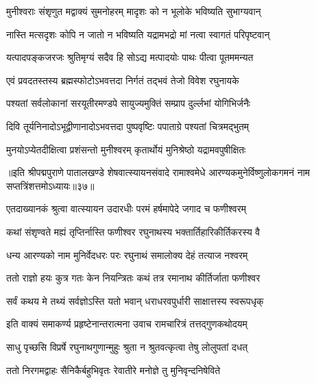 \twolineshloka
{मुनीश्वराः संशृणुत मद्वाक्यं सुमनोहरम्}
{मादृशः को न भूलोके भविष्यति सुभाग्यवान्}%

\twolineshloka
{नास्ति मत्सदृशः कोपि न जातो न भविष्यति}
{यद्रामभद्रो मां नत्वा स्वागतं परिपृष्टवान्}%

\twolineshloka
{यत्पादपङ्कजरजः श्रुतिमृग्यं सदैव हि}
{सोऽद्य मत्पादयोः पाथः पीत्वा पूतममन्यत}%

\twolineshloka
{एवं प्रवदतस्तस्य ब्रह्मस्फोटोऽभवत्तदा}
{निर्गतं तद्भवं तेजो विवेश रघुनायके}%

\twolineshloka
{पश्यतां सर्वलोकानां सरयूतीरमण्डपे}
{सायुज्यमुक्तिं सम्प्राप दुर्ल्लभां योगिभिर्जनैः}%

\twolineshloka
{दिवि तूर्यनिनादोऽभूद्वीणानादोऽभवत्तदा}
{पुष्पवृष्टिः पपाताग्रे पश्यतां चित्रमद्भुतम्}%

\twolineshloka
{मुनयोऽप्येतदीक्षित्वा प्रशंसन्तो मुनीश्वरम्}
{कृतार्थोयं मुनिश्रेष्ठो यद्रामवपुषीक्षितः}%

॥इति श्रीपद्मपुराणे पातालखण्डे शेषवात्स्यायनसंवादे रामाश्वमेधे आरण्यकमुनेर्विष्णुलोकगमनं नाम सप्तत्रिंशत्तमोऽध्यायः॥३७॥



\twolineshloka
{एतदाख्यानकं श्रुत्वा वात्स्यायन उदारधीः}
{परमं हर्षमापेदे जगाद च फणीश्वरम्}%


\twolineshloka
{कथां संशृण्वते मह्यं तृप्तिर्नास्ति फणीश्वर}
{रघुनाथस्य भक्तार्तिहारिकीर्तिकरस्य वै}%

\twolineshloka
{धन्य आरण्यको नाम मुनिर्वेदधरः परः}
{रघुनाथं समालोक्य देहं तत्याज नश्वरम्}%

\twolineshloka
{ततो राज्ञो हयः कुत्र गतः केन नियन्त्रितः}
{कथं तत्र रमानाथ कीर्तिर्जाता फणीश्वर}%

\twolineshloka
{सर्वं कथय मे तथ्यं सर्वज्ञोऽस्ति यतो भवान्}
{धराधरवपुर्धारी साक्षात्तस्य स्वरूपधृक्}%


\twolineshloka
{इति वाक्यं समाकर्ण्य प्रहृष्टेनान्तरात्मना}
{उवाच रामचारित्रं तत्तद्गुणकथोदयम्}%


\twolineshloka
{साधु पृच्छसि विप्रर्षे रघुनाथगुणान्मुहुः}
{श्रुता न श्रुतवत्कृत्वा तेषु लोलुपतां दधत्}%

\twolineshloka
{ततो निरगमद्वाहः सैनिकैर्बहुभिवृतः}
{रेवातीरे मनोज्ञे तु मुनिवृन्दनिषेविते}%

